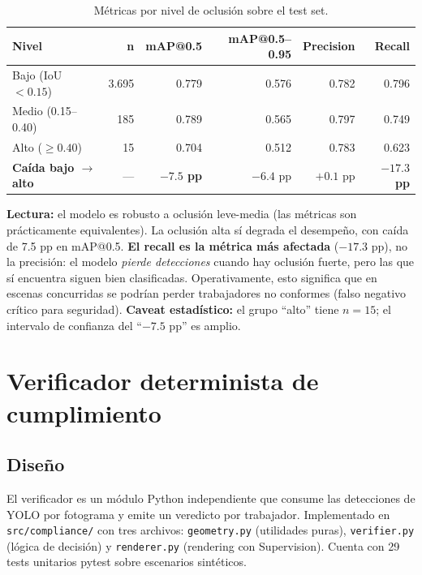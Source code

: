 \documentclass[conference]{IEEEtran}
\begin{document}
\begin{table}[t]
\centering
\caption{Métricas por nivel de oclusión sobre el test set.}
\label{tab:occ}
\renewcommand{\arraystretch}{1.2}
\begin{tabular}{l rrrrr}
\toprule
\textbf{Nivel} & \textbf{n} & \textbf{mAP@0.5} & \textbf{mAP@0.5--0.95}
& \textbf{Precision} & \textbf{Recall} \\
\midrule
Bajo (IoU $< 0.15$) & 3.695 & 0.779 & 0.576 & 0.782 & 0.796 \\
Medio (0.15--0.40) & 185 & 0.789 & 0.565 & 0.797 & 0.749 \\
Alto ($\geq 0.40$) & 15 & 0.704 & 0.512 & 0.783 & 0.623 \\
\midrule
\textbf{Caída bajo $\to$ alto} & — & \textbf{$-7.5$ pp} & $-6.4$ pp & $+0.1$ pp & \textbf{$-17.3$ pp} \\
\bottomrule
\end{tabular}
\end{table}

\textbf{Lectura:} el modelo es robusto a oclusión leve-media (las
métricas son prácticamente equivalentes). La oclusión alta sí degrada
el desempeño, con caída de 7.5 pp en mAP@0.5. \textbf{El recall es la
métrica más afectada} ($-17.3$ pp), no la precisión: el modelo
\emph{pierde detecciones} cuando hay oclusión fuerte, pero las que sí
encuentra siguen bien clasificadas. Operativamente, esto significa que
en escenas concurridas se podrían perder trabajadores no conformes
(falso negativo crítico para seguridad). \textbf{Caveat estadístico:}
el grupo ``alto'' tiene $n=15$; el intervalo de confianza del
``$-7.5$ pp'' es amplio.

\section{Verificador determinista de cumplimiento}

\subsection{Diseño}

El verificador es un módulo Python independiente que consume las
detecciones de YOLO por fotograma y emite un veredicto por trabajador.
Implementado en \texttt{src/compliance/} con tres archivos:
\texttt{geometry.py} (utilidades puras), \texttt{verifier.py} (lógica
de decisión) y \texttt{renderer.py} (rendering con Supervision).
Cuenta con 29 tests unitarios pytest sobre escenarios sintéticos.
\end{document}

